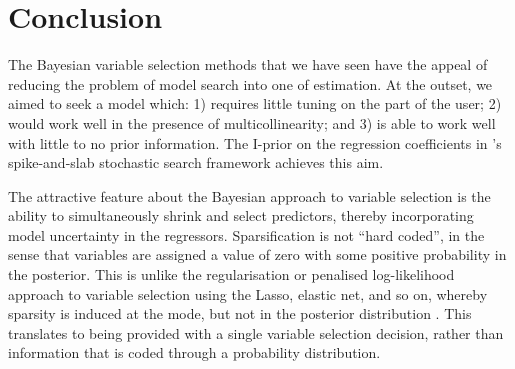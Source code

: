 \documentclass[a4paper,showframe,11pt]{report}
\begin{document}
\section{Conclusion}

The Bayesian variable selection methods that we have seen have the appeal of reducing the problem of model search into one of estimation. 
At the outset, we aimed to seek a model which: 1) requires little tuning on the part of the user; 2) would work well in the presence of multicollinearity; and 3) is able to work well with little to no prior information. 
The I-prior on the regression coefficients in \citeauthor{Kuo1998}'s spike-and-slab stochastic search framework achieves this aim.

The attractive feature about the Bayesian approach to variable selection is the ability to simultaneously shrink and select predictors, thereby incorporating model uncertainty in the regressors.
Sparsification is not ``hard coded'', in the sense that variables are assigned a value of zero with some positive probability in the posterior.
This is unlike the regularisation or penalised log-likelihood approach to variable selection using the Lasso, elastic net, and so on, whereby sparsity is induced at the mode, but not in the posterior distribution \citep{scott2014predicting}.
This translates to being provided with a single variable selection decision, rather than information that is coded through a probability distribution.
\end{document}
